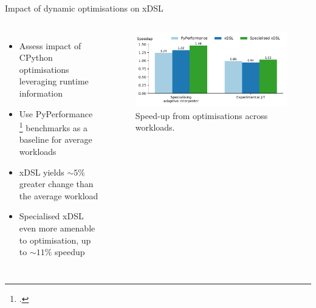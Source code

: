 \documentclass[10pt,aspectratio=169]{beamer}
\renewcommand{\cite}{\footcite}
\begin{document}
\begin{frame}{Impact of dynamic optimisations on xDSL}
    \begin{columns}[T,onlytextwidth]
            \begin{itemize}
                \itemindent=-13pt
                \item Assess impact of CPython optimisations leveraging runtime information
                \item Use PyPerformance \cite{collinwinterPythonPyperformance2025} benchmarks as a baseline for average workloads
                \vspace{1em}
                \item xDSL yields $\sim5\%$ greater change than the average workload
                \item Specialised xDSL even more amenable to optimisation, up to $\sim11\%$ speedup
            \end{itemize}
            \begin{figure}[H]
                \includegraphics[width=\textwidth]{images/15_summary.pdf}
                \caption{Speed-up from optimisations across workloads.}
                \label{fig:15_summary}
            \end{figure}
    \end{columns}
\end{frame}
\end{document}
